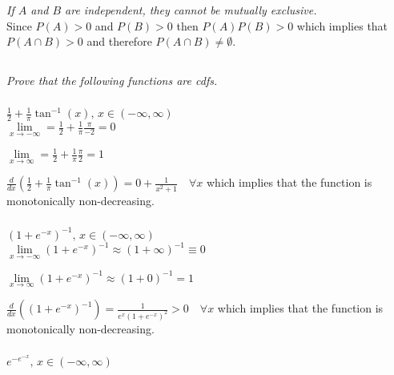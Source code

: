 \documentclass[12pt]{amsart}
\begin{document}
	\subsubsection{} \textit{If \(A\) and \(B\) are independent, they cannot be mutually exclusive.} \\
	
	Since \(P(A) > 0\) and \(P(B) > 0\) then \(P(A)P(B) > 0\) which implies that \(P(A\cap B)>0\)
	and therefore \(P(A\cap B)\neq\emptyset\). \\
	

\setcounter{subsection}{46}
\subsection{} %
\textit{Prove that the following functions are cdfs.}
	\subsubsection{} \( \frac{1}{2}+\frac{1}{\pi} \tan^{-1}(x),\, x\in(-\infty,\infty) \) \\
	
		$\lim\limits_{x\rightarrow-\infty} = \frac{1}{2}+\frac{1}{\pi}\frac{\pi}{-2} = 0$
		
		$\lim\limits_{x\rightarrow\infty} = \frac{1}{2}+\frac{1}{\pi}\frac{\pi}{2} = 1$
		
		$ \frac{d}{dx}\left(\frac{1}{2}+\frac{1}{\pi} \tan^{-1}(x)\right) = 0 + \frac{1}{x^2+1} \quad\forall x $ which implies that the function is monotonically non-decreasing. \\
	
	\subsubsection{} \( (1+e^{-x})^{-1},\, x\in(-\infty,\infty) \) \\
	
	$\lim\limits_{x\rightarrow-\infty} (1+e^{-x})^{-1} \approx (1+\infty)^{-1} \equiv 0$
	
	$\lim\limits_{x\rightarrow\infty} (1+e^{-x})^{-1} \approx (1+0)^{-1} = 1$
	
	$ \frac{d}{dx}\left( (1+e^{-x})^{-1} \right) = \frac{1}{e^{x}(1+e^{-x})^{2}} >0\quad\forall x $ which implies that the function is monotonically non-decreasing. \\
	
	\subsubsection{} \( e^{-e^{-x}},\, x\in(-\infty,\infty) \) \\
	
\end{document}
